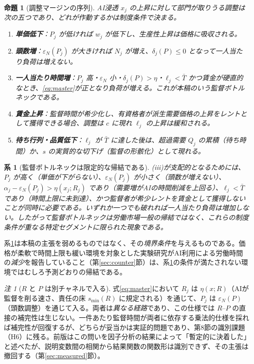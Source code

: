 \documentclass[11pt]{article}
\theoremstyle{plain}
\newtheorem{prop}{命題}
\newtheorem{cor}{系}
\theoremstyle{definition}
\theoremstyle{remark}
\newtheorem*{rmk}{注}
\begin{document}
\begin{prop}[調整マージンの序列]\label{p:margins}
AI浸透 $x_j$ の上昇に対して部門が取りうる調整は次の五つであり、どれが作動するかは制度条件で決まる。
\begin{enumerate}[label=(\roman*),leftmargin=1.8em,itemsep=1pt]
\item \textbf{単価低下}：$P_j$ が低ければ $w_j$ が低下し、生産性上昇は価格に吸収される。
\item \textbf{頭数増}：$\varepsilon_N(P_j)$ が大きければ $N_j$ が増え、$\delta_j(P)\le0$ となって一人当たり負荷は増えない。
\item \textbf{一人当たり時間増}：$P_j$ 高・$\varepsilon_N$ 小・$\delta_j(P)>\eta$・$\ell_j<\bar T$ かつ賃金が硬直的なとき、\eqref{eq:master}が正となり負荷が増える。\emph{これが本稿のいう監督ボトルネックである}。
\item \textbf{賃金上昇}：監督時間が希少化し、有資格者が派生需要価格の上昇をレントとして獲得できる場合、調整は $c$ に現れ $\ell_j$ の上昇は緩和される。
\item \textbf{待ち行列・品質低下}：$\ell_j$ が $\bar T$ に達した後は、超過需要 $Q_j$ の累積（待ち時間）か、$s$ の実質的な切下げ（監督の形骸化）として現れる。
\end{enumerate}
\end{prop}

\begin{cor}[監督ボトルネックは限定的な帰結である]\label{c:knife}
(iii)が支配的となるためには、$P_j$ が高く（単価が下がらない）、$\varepsilon_N(P_j)$ が小さく（頭数が増えない）、$\alpha_j-\varepsilon_N(P_j)>\eta(x_j;R_j)$ であり（需要増がAIの時間削減を上回る）、$\ell_j<\bar T$ であり（時間上限に未到達）、かつ監督者が希少レントを賃金として獲得しないことが\emph{同時に}必要である。いずれか一つでも破れれば一人当たり負荷は増加しない。したがって監督ボトルネックは労働市場一般の帰結ではなく、これらの制度条件が重なる特定セグメントに限られた現象である。
\end{cor}

系\ref{c:knife}は本稿の主張を弱めるものではなく、その\emph{境界条件}を与えるものである。価格が柔軟で時間上限も緩い環境を対象とした実験研究がAI利用による労働時間の\emph{減少}を報告していること（第\ref{sec:counter}節）は、系\ref{c:knife}の条件が満たされない環境ではむしろ予測どおりの帰結である。

\begin{rmk}[$R$ と $P$ は別チャネルで入る]
式\eqref{eq:master}において $R_j$ は $\eta(x;R)$（AIが監督を削る速さ、責任の床 $s_{\min}(R)$ に規定される）を通じて、$P_j$ は $\varepsilon_N(P)$（頭数調整）を通じて入る。両者は\emph{異なる経路}であり、この仕様では $R$--$P$ の直接の補完性は生じない。一件あたり監督時間が両者に依存する乗法的仕様を採れば補完性が回復するが、どちらが妥当かは実証的問題であり、第8節の識別課題（H6）に残る。前版はこの問いを因子分析の結果によって「暫定的に決着した」と述べたが、説明変数間の相関から結果関数の関数形は識別できず、その主張は撤回する（第\ref{sec:measured}節）。
\end{rmk}
\end{document}
